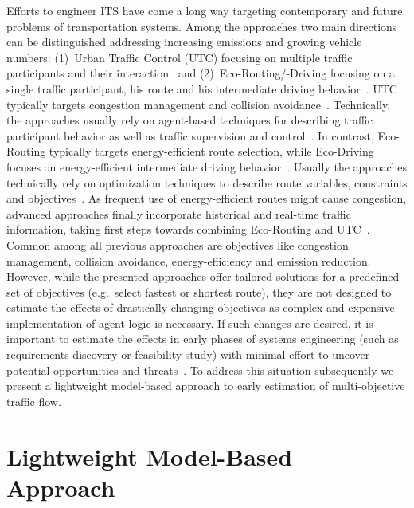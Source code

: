\documentclass[conference]{../cls/IEEEtran}
\begin{document}
Efforts to engineer ITS have come a long way targeting contemporary and future
problems of transportation systems. Among the approaches two main directions can
be distinguished addressing increasing emissions and growing vehicle numbers:
(1)~Urban Traffic Control (UTC) focusing on multiple traffic participants and
their interaction~\cite{Chen2010} and (2)~Eco-Routing/-Driving focusing
on a single traffic participant, his route and his intermediate driving
behavior~\cite{Ericsson2006,Boriboonsomsin2012}. UTC typically targets
congestion management and collision avoidance~\cite{Chen2010}. Technically, the
approaches usually rely on agent-based techniques for describing traffic
participant behavior as well as traffic supervision and control~\cite{Chen2010}.
In contrast, Eco-Routing typically targets energy-efficient route selection,
while Eco-Driving focuses on energy-efficient intermediate driving
behavior~\cite{Ericsson2006}. Usually the approaches technically rely
on optimization techniques to describe route variables, constraints and
objectives~\cite{Ericsson2006}. As frequent use of energy-efficient routes might
cause congestion, advanced approaches finally incorporate historical and
real-time traffic information, taking first steps towards combining
Eco-Routing and UTC~\cite{Boriboonsomsin2012}. 
Common among all previous approaches are objectives like congestion management,
collision avoidance, energy-efficiency and emission reduction. 
However, while the presented approaches offer tailored solutions for a
predefined set of objectives (e.g.\ select fastest or shortest route), they are not designed to
estimate the effects of drastically changing objectives as complex and
expensive implementation of agent-logic is necessary.
If such changes are desired, it is important to
estimate the effects in early phases of systems engineering (such as
requirements discovery or feasibility study) with minimal effort to uncover
potential opportunities and threats~\cite{Whitten2005}. To address this
situation subsequently we present a lightweight model-based approach to early
estimation of multi-objective traffic flow.

\section{Lightweight Model-Based Approach}
\label{sec:approach}
\end{document}
